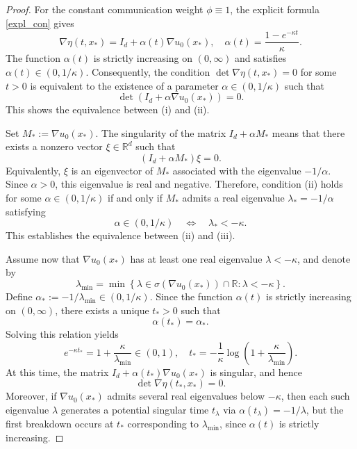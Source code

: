 \documentclass[11pt]{amsart}
\numberwithin{equation}{section}
\theoremstyle{definition}
\theoremstyle{remark}
\numberwithin{equation}{section}
\newcommand{\R}{\mathbb R}
\newcommand{\lt}{\left}
\newcommand{\rt}{\right}
\begin{document}
\begin{proof}
For the constant communication weight $\phi\equiv1$, the explicit formula
\eqref{expl_con} gives
\[
\nabla\eta(t,x_*)=I_d+\alpha(t)\nabla u_0(x_*), \quad \alpha(t)=\frac{1-e^{-\kappa t}}{\kappa}.
\]
The function $\alpha(t)$ is strictly increasing on $(0,\infty)$ and satisfies $\alpha(t)\in(0,1/\kappa)$.
Consequently, the condition $\det\nabla\eta(t,x_*)=0$ for some $t>0$ is equivalent to the existence of a parameter $\alpha\in(0,1/\kappa)$ such that
\[
\det\lt(I_d+\alpha\nabla u_0(x_*)\rt)=0.
\]
This shows the equivalence between {\rm(i)} and {\rm(ii)}.

Set $M_*:=\nabla u_0(x_*)$. The singularity of the matrix $I_d+\alpha M_*$ means that there exists a nonzero vector $\xi\in\R^d$ such that
\[
(I_d+\alpha M_*)\xi=0. 
\]
Equivalently, $\xi$ is an eigenvector of $M_*$ associated with the eigenvalue $-1/\alpha$. Since $\alpha>0$, this eigenvalue is real and negative. Therefore, condition {\rm(ii)} holds for some $\alpha\in(0,1/\kappa)$ if and only if $M_*$ admits a real eigenvalue $\lambda_*=-1/\alpha$ satisfying
\[
\alpha\in(0,1/\kappa) \quad \Longleftrightarrow \quad \lambda_*<-\kappa.
\]
This establishes the equivalence between {\rm(ii)} and {\rm(iii)}.

Assume now that $\nabla u_0(x_*)$ has at least one real eigenvalue $\lambda<-\kappa$, and denote by
\[
\lambda_{\min}=\min\lt\{\lambda\in\sigma(\nabla u_0(x_*))\cap\R : \lambda<-\kappa\rt\}.
\]
Define $\alpha_*:=-1/\lambda_{\min}\in(0,1/\kappa)$. Since the function $\alpha(t)$ is strictly increasing on $(0,\infty)$, there exists a unique $t_*>0$ such that
\[
\alpha(t_*)=\alpha_*.
\]
Solving this relation yields
\[
e^{-\kappa t_*}=1+\frac{\kappa}{\lambda_{\min}}\in(0,1),
\quad
t_*=-\frac1\kappa\log\lt(1+\frac{\kappa}{\lambda_{\min}}\rt).
\]
At this time, the matrix $I_d+\alpha(t_*)\nabla u_0(x_*)$ is singular, and hence
\[
\det\nabla\eta(t_*,x_*)=0.
\]
Moreover, if $\nabla u_0(x_*)$ admits several real eigenvalues below $-\kappa$, then each such eigenvalue
$\lambda$ generates a potential singular time $t_\lambda$ via $\alpha(t_\lambda)=-1/\lambda$, but the
first breakdown occurs at $t_*$ corresponding to $\lambda_{\min}$, since $\alpha(t)$ is strictly increasing.
\end{proof}
\end{document}
